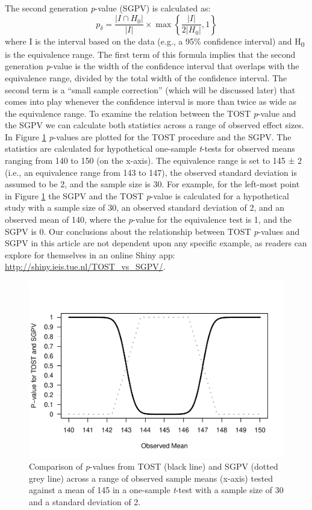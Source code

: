 \documentclass[floatsintext,man]{apa6}
\theoremstyle{definition}
\theoremstyle{definition}
\theoremstyle{definition}
\theoremstyle{remark}
\begin{document}
The second generation \emph{p}-value (SGPV) is calculated as: \[
  p _ { \delta } = \frac { \left| I \cap H _ { 0 } \right| } { | I | } \times \max \left\{ \frac { | I | } { 2 \left| H _ { 0 } \right| } , 1 \right\}
\] where I is the interval based on the data (e.g., a 95\% confidence
interval) and H\textsubscript{0} is the equivalence range. The first
term of this formula implies that the second generation \emph{p}-value
is the width of the confidence interval that overlaps with the
equivalence range, divided by the total width of the confidence
interval. The second term is a \enquote{small sample correction} (which
will be discussed later) that comes into play whenever the confidence
interval is more than twice as wide as the equivalence range. To examine
the relation between the TOST \emph{p}-value and the SGPV we can
calculate both statistics across a range of observed effect sizes. In
Figure \ref{fig:TOSTSGPV1} \emph{p}-values are plotted for the TOST
procedure and the SGPV. The statistics are calculated for hypothetical
one-sample \emph{t}-tests for observed means ranging from 140 to 150 (on
the x-axis). The equivalence range is set to 145 ± 2 (i.e., an
equivalence range from 143 to 147), the observed standard deviation is
assumed to be 2, and the sample size is 30. For example, for the
left-most point in Figure \ref{fig:TOSTSGPV1} the SGPV and the TOST
\emph{p}-value is calculated for a hypothetical study with a sample size
of 30, an observed standard deviation of 2, and an observed mean of 140,
where the \emph{p}-value for the equivalence test is 1, and the SGPV is
0. Our conclusions about the relationship between TOST \emph{p}-values
and SGPV in this article are not dependent upon any specific example, as
readers can explore for themselves in an online Shiny app:
\url{http://shiny.ieis.tue.nl/TOST_vs_SGPV/}.

\begin{figure}
\centering
\includegraphics{manuscript_files/figure-latex/TOSTSGPV1-1.pdf}
\caption{\label{fig:TOSTSGPV1}Comparison of \emph{p}-values from TOST (black
line) and SGPV (dotted grey line) across a range of observed sample
means (x-axis) tested against a mean of 145 in a one-sample
\emph{t}-test with a sample size of 30 and a standard deviation of 2.}
\end{figure}
\end{document}
